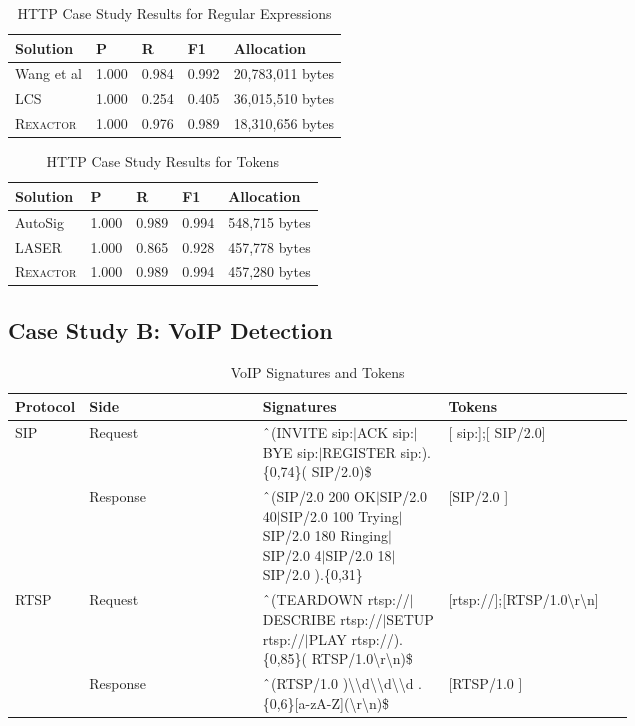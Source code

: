 \begin{table}[H]
  \centering
  \begin{tabular}{|l|l|l|l|l|}
   \hline
   Solution & P & R & F1 & Allocation \\
   \hline\hline
   Wang et al & 1.000 & 0.984 & 0.992 & 20,783,011 bytes\\
   LCS & 1.000 & 0.254 & 0.405 & 36,015,510 bytes \\
   \textsc{Rexactor} & 1.000 & 0.976 & 0.989 & 18,310,656 bytes\\

   \hline
  \end{tabular}
  \caption{HTTP Case Study Results for Regular Expressions}
  \label{table:httpprecisionregex}
\end{table}

\begin{table}[H]
  \centering
  \begin{tabular}{|l|l|l|l|l|}
   \hline
   Solution & P & R & F1 & Allocation \\
   \hline\hline
   AutoSig & 1.000 & 0.989 & 0.994 & 548,715 bytes \\
   LASER & 1.000 & 0.865 & 0.928 & 457,778 bytes \\
   \textsc{Rexactor} & 1.000 & 0.989 & 0.994 & 457,280 bytes \\
   \hline
  \end{tabular}
  \caption{HTTP Case Study Results for Tokens}
  \label{table:httpprecisiontokens}
\end{table}

\subsection{Case Study B: VoIP Detection}
\begin{table*}[t]
  \centering
  \begin{tabular}{|p{0.12\linewidth}|l|p{0.3\linewidth}|p{0.3\linewidth}|}
   \hline
   Protocol & Side & Signatures & Tokens \\ [0.5ex]
   \hline\hline
   SIP & Request & $\string^$(INVITE sip:$\vert$ACK sip:$\vert$BYE sip:$\vert$REGISTER sip:).\{0,74\}( SIP/2.0)\$ & [ sip:];[ SIP/2.0] \\
   \cline{2-4}
   & Response & $\string^$(SIP/2.0 200 OK$\vert$SIP/2.0 40$\vert$SIP/2.0 100 Trying$\vert$SIP/2.0 180 Ringing$\vert$SIP/2.0 4$\vert$SIP/2.0 18$\vert$SIP/2.0 ).\{0,31\} & [SIP/2.0 ] \\
  \hline
  RTSP & Request & $\string^$(TEARDOWN rtsp://$\vert$DESCRIBE rtsp://$\vert$SETUP rtsp://$\vert$PLAY rtsp://).\{0,85\}( RTSP/1.0\textbackslash r\textbackslash n)\$ & [rtsp://];[RTSP/1.0\textbackslash r\textbackslash n] \\
  \cline{2-4}
  & Response & $\string^$(RTSP/1.0 )\textbackslash\textbackslash d\textbackslash\textbackslash d\textbackslash\textbackslash d .\{0,6\}[a-zA-Z](\textbackslash r\textbackslash n)\$ & [RTSP/1.0 ] \\
  \hline
  \end{tabular}
  \caption{VoIP Signatures and Tokens}
  \label{table:voip}
\end{table*}

